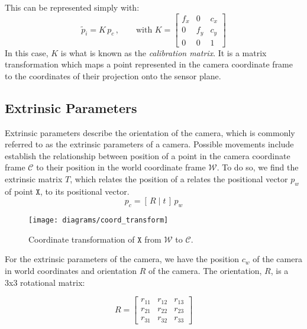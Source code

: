 This can be represented simply with:
\begin{equation}
    \widetilde{p}_i = K\, p_c
    \,,\qquad\text{with } K =
    \begin{bmatrix}
        f_x & 0   & c_x \\
        0   & f_y & c_y \\
        0   & 0   & 1
    \end{bmatrix}
\end{equation}
In this case, $K$ is what is known as the \emph{calibration matrix}. It is a matrix transformation which maps a point represented in the camera coordinate frame to the coordinates of their projection onto the sensor plane.



\subsection{Extrinsic Parameters} \label{sec:extrinsics}

Extrinsic parameters describe the orientation of the camera, which is commonly referred to as the extrinsic parameters of a camera. Possible movements include 
establish the relationship between position of a point in the camera coordinate frame $\mathcal{C}$ to their position in the world coordinate frame $\mathcal{W}$. To do so, we find the extrinsic matrix $T$, which relates the position of a
relates the positional vector $p_w$ of point $\mathtt{X}$, to its positional vector.
\begin{equation} \label{eq:pc}
    p_c = [\,R\;|\;t\,]\,p_w
\end{equation}

\begin{figure}[H]
    \centering
    \texttt{[image: diagrams/coord\_transform]}
    \caption{Coordinate transformation of $\mathtt{X}$ from $\mathcal{W}$ to $\mathcal{C}$.}
\end{figure}


For the extrinsic parameters of the camera, we have the position $c_w$ of the camera in world coordinates and orientation $R$ of the camera. The orientation, $R$, is a 3x3 rotational matrix:

\begin{equation}
    R =
    \begin{bmatrix}
        r_{11} & r_{12} & r_{13} \\
        r_{21} & r_{22} & r_{23} \\
        r_{31} & r_{32} & r_{33}
    \end{bmatrix}
\end{equation}

